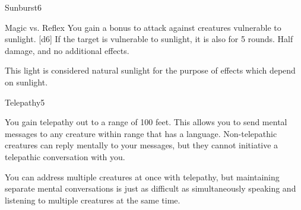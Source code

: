 \begin{spellsection}{Sunburst}{6}
    \begin{spellheader}
    \end{spellheader}
    \begin{spellcontent}
        \begin{spelltargetinginfo}
        \end{spelltargetinginfo}
        \begin{spelleffects}
            \begin{spellattack}{Magic vs. Reflex}
                \spellspecial You gain a  bonus to attack against creatures vulnerable to sunlight.
                \spellsuccess {}[d6]
                \spellcritical If the target is vulnerable to sunlight, it is also \blinded for 5 rounds.
                \spellfailure Half damage, and no additional effects.
            \end{spellattack}
        \end{spelleffects}
    \end{spellcontent}
    \begin{spellfooter}
        \spellnotes This light is considered natural sunlight for the purpose of effects which depend on sunlight.
        \miscastyou
    \end{spellfooter}
\end{spellsection}


\begin{spellsection}{Telepathy}{5}
    \begin{spellheader}
    \end{spellheader}
    \begin{spellcontent}
        \begin{spelltargetinginfo}
        \end{spelltargetinginfo}
        \begin{spelleffects}
            \spelleffect You gain telepathy out to a range of 100 feet. This allows you to send mental messages to any creature within range that has a language. Non-telepathic creatures can reply mentally to your messages, but they cannot initiative a telepathic conversation with you.

            You can address multiple creatures at once with telepathy, but maintaining separate mental conversations is just as difficult as simultaneously speaking and listening to multiple creatures at the same time. 
            \spelldur \durlong
        \end{spelleffects}
    \end{spellcontent}
    \begin{spellfooter}
        \miscastexplode
    \end{spellfooter}
\end{spellsection}

